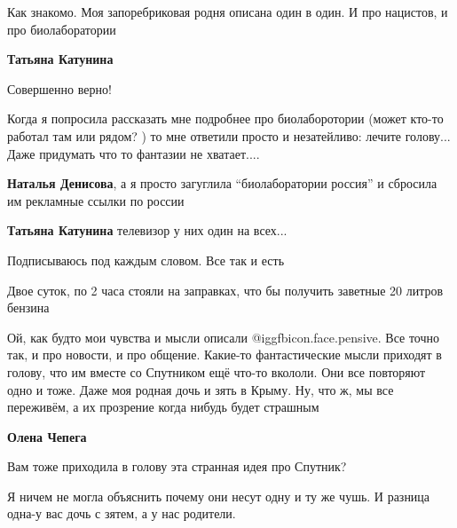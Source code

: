  
 
 
 
 
\zzSecCmt

\begin{itemize} %

Как знакомо. Моя запоребриковая родня описана один в один. И про нацистов, и
про биолаборатории

\begin{itemize} %
\textbf{Татьяна Катунина}

Совершенно верно!

Когда я попросила рассказать мне подробнее про биолаборотории (может кто-то
работал там или рядом? ) то мне ответили просто и незатейливо: лечите голову...
Даже придумать что то фантазии не хватает....

\textbf{Наталья Денисова}, а я просто загуглила \enquote{биолаборатории россия} и сбросила им рекламные ссылки по россии

\textbf{Татьяна Катунина} телевизор у них один на всех...
\end{itemize} %

Подписываюсь под каждым словом. Все так и есть

Двое суток, по 2 часа стояли на заправках, что бы получить заветные 20 литров бензина


Ой, как будто мои чувства и мысли описали @igg{fbicon.face.pensive}. Все точно так, и про новости, и
про общение. Какие-то фантастические мысли приходят в голову, что им вместе со
Спутником ещё что-то вкололи. Они все повторяют одно и тоже. Даже моя родная
дочь и зять в Крыму. Ну, что ж, мы все переживём, а их прозрение когда нибудь
будет страшным

\begin{itemize} %
\textbf{Олена Чепега}

Вам тоже приходила в голову эта странная идея про Спутник?

Я ничем не могла объяснить почему они несут одну и ту же чушь. И разница одна-у
вас дочь с зятем, а у нас родители.


\end{itemize}
\end{itemize}
